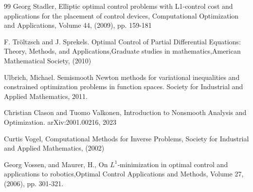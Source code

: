 \documentclass[11pt,a4paper]{amsart}
\begin{document}
\begin{thebibliography}{99}
Georg Stadler, Elliptic optimal control problems with L1-control cost and applications for the placement of control devices, Computational Optimization and Applications, Volume 44, (2009), pp. 159-181

  F. Tröltzsch and J. Sprekels. Optimal Control of Partial Differential Equations: Theory, Methods, and Applications,Graduate studies in mathematics,American Mathematical Society, (2010)


Ulbrich, Michael. Semismooth Newton methods for variational inequalities and constrained optimization problems in function spaces. Society for Industrial and Applied Mathematics, 2011.

Christian Clason and Tuomo Valkonen, Introduction to Nonsmooth Analysis and Optimization. 	arXiv:2001.00216, 2023

 Curtis Vogel, Computational Methods for Inverse Problems, Society for Industrial and Applied Mathematics, (2002)

 Georg Vossen, and Maurer, H., On $L^1$‐minimization in optimal control and applications to robotics,Optimal Control Applications and Methods, Volume 27, (2006), pp. 301-321. 
\end{thebibliography}
\end{document}
